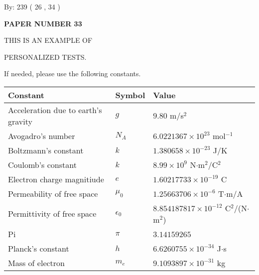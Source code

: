 \documentclass[12pt]{article}
\begin{document}
   
\hspace{1.0in} By: 
         239 (          26 ,           34 )
   
   
   
   
\newpage 
\setcounter{page}{ 
    33001 } 
   
   
   
   
 {\textbf{ \Large{ PAPER NUMBER           33  }}}
   
   
\vspace{0.2in}
   
   
   
   
   
   
   
   
 \vspace{0.2in}
 
 
{\Huge  THIS IS AN EXAMPLE OF}
 
{\Huge  PERSONALIZED TESTS. }
 
If needed, please use the following constants.
 
 
 
\noindent\begin{tabular}{|l|l|l|}
\hline
Constant & Symbol & Value \\
\hline
Acceleration due to earth's gravity &
$g$ &
 $ 9.80 $
m/s$^2$ \\
\hline
Avogadro's number &
$N_A$ &
 $ 6.0221367 \times 10^{23} $
mol$^{-1}$ \\
\hline
Boltzmann's constant &
$k$ &
 $ 1.380658 \times 10^{-23} $
J/K \\
\hline
Coulomb's constant &
$k$ &
 $ 8.99 \times 10^{9} $
N$\cdot $m$^2$/C$^2$ \\
\hline
Electron charge magnitiude &
$e$ &
 $ 1.60217733 \times 10^{-19} $
C \\
\hline
Permeability of free space &
$\mu _0$ &
 $ 1.25663706 \times 10^{-6} $
T$\cdot $m/A \\
\hline
Permittivity of free space &
$\epsilon _0$ &
 $ 8.854187817 \times 10^{-12} $
C$^2$/(N$\cdot $m$^2$) \\
\hline
Pi &
$\pi$ &
 $ 3.14159265 $
$ $ \\
\hline
Planck's constant &
$h$ &
 $ 6.6260755 \times 10^{-34} $
J$\cdot $s \\
\hline
Mass of electron &
$m_e$ &
 $ 9.1093897 \times 10^{-31} $
kg \\
\hline
\end{tabular}
 
\end{document}

